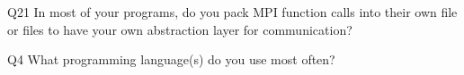 \begin{description}%
\item{Q21} In most of your programs, do you pack MPI function calls into their own file or files to have your own abstraction layer for communication?%
\item{Q4} What programming language(s) do you use most often?%
\end{description}%
